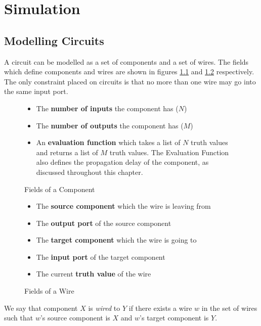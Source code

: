 \chapter{Simulation}
\label{chapter:simulation}

\section{Modelling Circuits}
A circuit can be modelled as a set of components and a set of wires. The fields which define components and wires are shown in figures \ref{fig:component} and \ref{fig:wire} respectively. The only constraint placed on circuits is that no more than one wire may go into the same input port.

\begin{figure}[H]
\centering
\begin{itemize}
	\item The \textbf{number of inputs} the component has ($N$)
	\item The \textbf{number of outputs} the component has ($M$)
	\item An \textbf{evaluation function} which takes a list of $N$ truth values and returns a list  of $M$ truth values. The Evaluation Function also defines the propagation delay of the component, as discussed throughout this chapter.
\end{itemize}
\caption{Fields of a Component}
\label{fig:component}
\end{figure}

\begin{figure}[H]
\centering
\begin{itemize}
	\item The \textbf{source component} which  the wire is leaving from
	\item The \textbf{output port} of the source component
	\item The \textbf{target component} which the wire is going to
	\item The \textbf{input port} of the target component
	\item The current \textbf{truth value} of the wire 
\end{itemize}
\caption{Fields of a Wire}
\label{fig:wire}
\end{figure}

We say that component $X$ is \textit{wired} to $Y$ if there exists a wire $w$ in the set of wires such that $w$'s source component is $X$ and $w$'s target component is $Y$.

